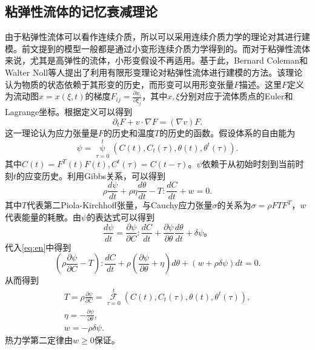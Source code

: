 \subsection{粘弹性流体的记忆衰减理论}
由于粘弹性流体可以看作连续介质，所以可以采用连续介质力学的理论对其进行建模。前文提到的模型一般都是通过小变形连续介质力学得到的。而对于粘弹性流体来说，尤其是高弹性的流体，小形变假设不再适用。基于此，Bernard Coleman和Walter Noll等人提出了利用有限形变理论对粘弹性流体进行建模的方法\cite{coleman1961foundations,coleman1964thermodynamics,coleman2012viscometric}。该理论认为物质的状态依赖于其形变的历史，而形变可以用形变张量$F$描述。这里$F$定义为流动图$x = x(\xi,t)$的梯度$F_{ij} = \frac{\partial x_i}{\partial \xi_j}$，其中$x,\xi$分别对应于流体质点的Euler和Lagrange坐标。根据定义可以得到
\begin{equation}\label{eq:Feq}
	\partial_t F + v \cdot \nabla F = (\nabla v) F.
\end{equation}
这一理论认为应力张量是$F$的历史和温度$T$的历史的函数。假设体系的自由能为
\begin{equation*}
	\psi = \mathop{\psi} \limits_{\tau=0}^{t}( C(t), C_t(\tau),\theta(t),\theta^t(\tau)).
\end{equation*}
其中$C(t) = F^T(t) F(t),C^t(\tau) = C(t - \tau)$。$\psi$依赖于从初始时刻到当前时刻$t$的应变历史。利用Gibbs关系，可以得到
\begin{equation}\label{eq:en}
	\rho \frac{d\psi}{dt} + \rho \eta \frac{d \theta}{dt} - T: \frac{dC}{dt} + w = 0.
\end{equation}
其中$T$代表第二Piola-Kirchhoff张量，与Cauchy应力张量$\sigma$的关系为$\sigma = \rho F T F^T$，$w$代表能量的耗散。由$\psi$的表达式可以得到
\begin{equation*}
	\frac{d\psi}{dt} = \frac{\partial \psi}{\partial C} : \frac{d C}{dt}+ \frac{\partial \psi}{\partial \theta} \frac{d\theta}{dt} + \delta \psi。
\end{equation*}
代入\eqref{eq:en}中得到
\begin{equation*}
	(\rho \frac{\partial \psi}{\partial C} - T) : \frac{dC}{dt} + \rho (\frac{\partial \psi}{\partial \theta} + \eta) d\theta + (w + \rho \delta \psi) dt  =0.
\end{equation*}
从而得到
\begin{eqnarray*}
	T = \rho \frac{\partial \psi}{\partial C} = \mathop{\mathcal{F}}\limits_{\tau=0}^{t} ( C(t), C_t(\tau),\theta(t),\theta^t(\tau)), \\
	\eta = -\frac{\partial \psi}{\partial \theta},\\
	w = -\rho \delta \psi.
\end{eqnarray*}
热力学第二定律由$w \ge 0$保证\cite{coleman1961foundations,dimitrienko2010nonlinear}。

